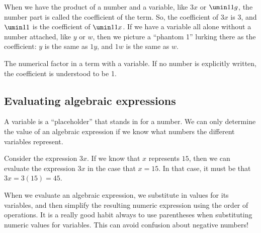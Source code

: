When we have the product of a number and a variable, like $3x$ or $\umin11g$, the number part is called the \gls{coefficient} of the term. So, the coefficient of $3x$ is 3, and $\umin11$ is the coefficient of $\umin11x$. If we have a variable all alone without a number attached, like $y$ or $w$, then we picture a ``phantom 1'' lurking there as the coefficient: $y$ is the same as $1y$, and $1w$ is the same as $w$.

\begin{boxdef}[Coefficient]
The numerical factor in a term with a variable. If no number is explicitly written, the coefficient is understood to be 1.
\end{boxdef}

\subsection{Evaluating algebraic expressions}

A variable is a ``placeholder'' that stands in for a number. We can only determine the value of an algebraic expression if we know what numbers the different variables represent.

Consider the expression $3x$. If we know that $x$ represents $15$, then we can \gls{evaluate} the expression $3x$ in the case that $x = 15$. In that case, it must be that $3x = 3(15) = 45$.

When we evaluate an algebraic expression, we substitute in values for its variables, and then simplify the resulting numeric expression using the order of operations. It is a really good habit always to use parentheses when substituting numeric values for variables. This can avoid confusion about negative numbers!

